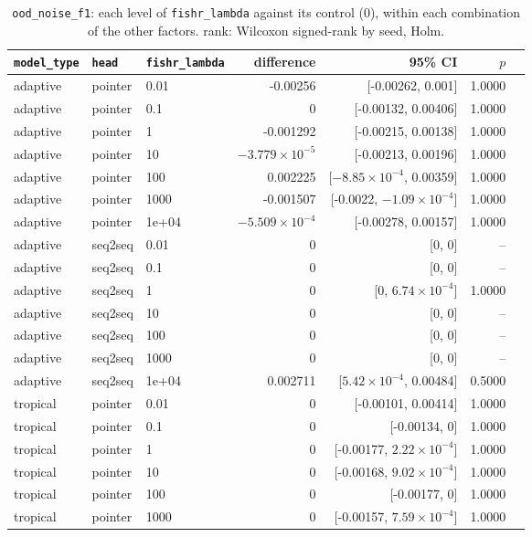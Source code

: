 \documentclass[10pt]{article}
\begin{document}
{\small
\begin{longtable}{lllrrrl}
\caption{\texttt{ood\_noise\_f1}: each level of \texttt{fishr\_lambda} against its control (0), within each combination of the other factors. rank: Wilcoxon signed-rank by seed, Holm.}\label{tab:control-ood_noise_f1}\\
\toprule
\texttt{model\_type} & \texttt{head} & \texttt{fishr\_lambda} & difference & 95\% CI & $p$ & \\
\midrule
\endhead
adaptive & pointer & 0.01 & -0.00256 & [-0.00262, 0.001] & 1.0000 & \\
adaptive & pointer & 0.1 & 0 & [-0.00132, 0.00406] & 1.0000 & \\
adaptive & pointer & 1 & -0.001292 & [-0.00215, 0.00138] & 1.0000 & \\
adaptive & pointer & 10 & $-3.779\times10^{-5}$ & [-0.00213, 0.00196] & 1.0000 & \\
adaptive & pointer & 100 & 0.002225 & [$-8.85\times10^{-4}$, 0.00359] & 1.0000 & \\
adaptive & pointer & 1000 & -0.001507 & [-0.0022, $-1.09\times10^{-4}$] & 1.0000 & \\
adaptive & pointer & 1e+04 & $-5.509\times10^{-4}$ & [-0.00278, 0.00157] & 1.0000 & \\
adaptive & seq2seq & 0.01 & 0 & [0, 0] & -- & \\
adaptive & seq2seq & 0.1 & 0 & [0, 0] & -- & \\
adaptive & seq2seq & 1 & 0 & [0, $6.74\times10^{-4}$] & 1.0000 & \\
adaptive & seq2seq & 10 & 0 & [0, 0] & -- & \\
adaptive & seq2seq & 100 & 0 & [0, 0] & -- & \\
adaptive & seq2seq & 1000 & 0 & [0, 0] & -- & \\
adaptive & seq2seq & 1e+04 & 0.002711 & [$5.42\times10^{-4}$, 0.00484] & 0.5000 & \\
tropical & pointer & 0.01 & 0 & [-0.00101, 0.00414] & 1.0000 & \\
tropical & pointer & 0.1 & 0 & [-0.00134, 0] & 1.0000 & \\
tropical & pointer & 1 & 0 & [-0.00177, $2.22\times10^{-4}$] & 1.0000 & \\
tropical & pointer & 10 & 0 & [-0.00168, $9.02\times10^{-4}$] & 1.0000 & \\
tropical & pointer & 100 & 0 & [-0.00177, 0] & 1.0000 & \\
tropical & pointer & 1000 & 0 & [-0.00157, $7.59\times10^{-4}$] & 1.0000 & \\

\end{longtable}}
\end{document}
